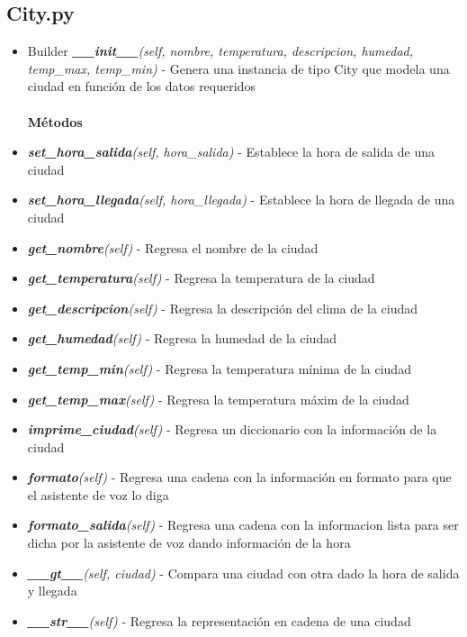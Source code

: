 \documentclass{article}
\begin{document}
    \subsection{City.py}
        \begin{itemize}
            \item Builder \textit{\textbf{\_\_init\_\_}(self, nombre, temperatura, descripcion, humedad, temp\_max, temp\_min)} - Genera una instancia de tipo City que modela una ciudad en función de los datos requeridos \\\\
            \textbf{Métodos}
            \item \textit{\textbf{set\_hora\_salida}(self, hora\_salida)} - Establece la hora de salida de una ciudad
            \item \textit{\textbf{set\_hora\_llegada}(self, hora\_llegada)} - Establece la hora de llegada de una ciudad
            \item \textit{\textbf{get\_nombre}(self)} - Regresa el nombre de la ciudad
            \item \textit{\textbf{get\_temperatura}(self)} - Regresa la temperatura de la ciudad
            \item \textit{\textbf{get\_descripcion}(self)} - Regresa la descripción del clima de la ciudad
            \item \textit{\textbf{get\_humedad}(self)} - Regresa la humedad de la ciudad
            \item \textit{\textbf{get\_temp\_min}(self)} - Regresa la temperatura mínima de la ciudad
            \item \textit{\textbf{get\_temp\_max}(self)} - Regresa la temperatura máxim de la ciudad
            \item \textit{\textbf{imprime\_ciudad}(self)} - Regresa un diccionario con la información de la ciudad
            \item \textit{\textbf{formato}(self)} - Regresa una cadena con la información en formato para que el asistente de voz lo diga
            \item \textit{\textbf{formato\_salida}(self)} - Regresa una cadena con la informacion lista para ser dicha por la asistente de voz dando información de la hora
            \item \textit{\textbf{\_\_gt\_\_}(self, ciudad)} - Compara una ciudad con otra dado la hora de salida y llegada
            \item \textit{\textbf{\_\_str\_\_}(self)} - Regresa la representación en cadena de una ciudad
            \end{itemize}
\end{document}

